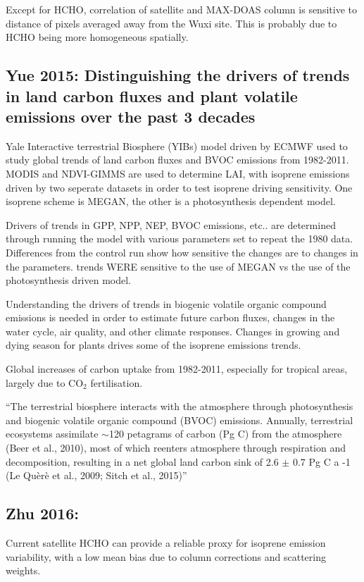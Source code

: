 \documentclass[11pt]{article} %
\begin{document}
    Except for HCHO, correlation of satellite and MAX-DOAS column is sensitive to distance of pixels averaged away from the Wuxi site.
    This is probably due to HCHO being more homogeneous spatially.
    
  \subsection{Yue 2015: Distinguishing the drivers of trends in land carbon fluxes and plant
volatile emissions over the past 3 decades}
    \citet{Yue2015}
    Yale Interactive terrestrial Biosphere (YIBs) model driven by ECMWF used to study global trends of land carbon fluxes and BVOC emissions from 1982-2011.
    MODIS and NDVI-GIMMS are used to determine LAI, with isoprene emissions driven by two seperate datasets in order to test isoprene driving sensitivity.
    One isoprene scheme is MEGAN, the other is a photosynthesis dependent model.
    
    Drivers of trends in GPP, NPP, NEP, BVOC emissions, etc.. are determined through running the model with various parameters set to repeat the 1980 data.
    Differences from the control run show how sensitive the changes are to changes in the parameters.
    trends WERE sensitive to the use of MEGAN vs the use of the photosynthesis driven model.
    
    Understanding the drivers of trends in biogenic volatile organic compound emissions is needed in order to estimate future carbon fluxes, changes in the water cycle, air quality, and other climate responses.
    Changes in growing and dying season for plants drives some of the isoprene emissions trends.
    
    Global increases of carbon uptake from 1982-2011, especially for tropical areas, largely due to CO$_2$ fertilisation.
    
    ``The terrestrial biosphere interacts with the atmosphere through photosynthesis and biogenic volatile organic compound (BVOC) emissions. Annually, terrestrial ecosystems assimilate $\sim$120 petagrams of carbon (Pg C) from the atmosphere (Beer et al., 2010), most of which reenters atmosphere through respiration and decomposition, resulting in a net global land carbon sink of 2.6 $\pm$ 0.7 Pg C a -1 (Le Quèrè et al., 2009; Sitch et al., 2015)''
    
  \subsection{Zhu 2016: }
    \citet{Zhu2016}
    Current satellite HCHO can provide a reliable proxy for isoprene emission variability, with a low mean bias due to column corrections and scattering weights.
    
\end{document}
